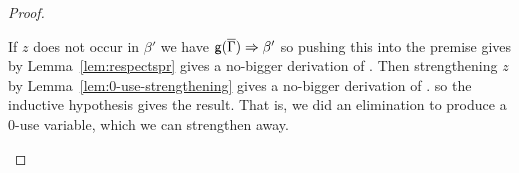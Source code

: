 \begin{proof}
\begin{itemize}
If $z$ does not occur in $\beta'$ we have $\mathsf{g}(\overline{\Gamma}) \Rightarrow
\beta'$ so pushing this into the premise gives by
Lemma~\ref{lem:respectspr} gives a no-bigger derivation of
.
Then strengthening $z$ by Lemma~\ref{lem:0-use-strengthening} gives a
no-bigger derivation of
.  so the
inductive hypothesis gives the result.  That is, we did an elimination
to produce a 0-use variable, which we can strengthen away.  
\end{itemize}

\end{proof}


